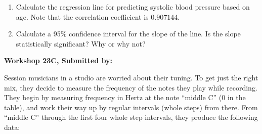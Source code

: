 \documentclass[11pt]{book}\usepackage[]{graphicx}\usepackage[]{color}
\begin{document}
\begin{exercises}
\begin{exercise}
\begin{enumerate}
  \item Calculate the regression line for predicting systolic blood pressure based on age. Note that the correlation coefficient is $0.907144$.

  \item Calculate a 95\% confidence interval for the slope of the line.  Is the slope statistically significant?  Why or why not?

\end{enumerate}

\end{exercise}
\begin{solution}  %

\end{solution}

\clearpage

    \begin{exercise}  %

    \begin{center}
\begin{flushleft}\textbf{\large \hfill Workshop 23C, Submitted by: }\end{flushleft}

\end{center}

Session musicians in a studio are worried about their tuning. To get just the right mix, they decide to measure the frequency of the notes they play while recording. They begin by measuring frequency in Hertz at the note ``middle C'' (0 in the table), and work their way up by regular intervals (whole steps) from there. From ``middle C'' through the first four whole step intervals, they produce the following data:


\end{exercise}
\end{exercises}
\end{document}
